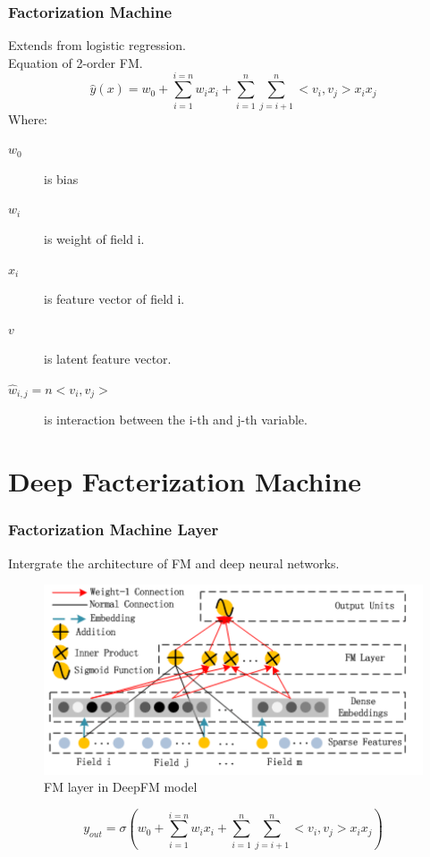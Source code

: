 \documentclass{beamer}
\begin{document}
\begin{frame}
	\frametitle{Factorization Machine}
	Extends from logistic regression. \\
	Equation of 2-order FM. \\
	\[
	\hat{y}(x) = w_{0} + \sum_{i=1}^{i=n} w_{i} x_{i} + \sum_{i=1}^n \sum_{j=i+1}^n<v_i, v_j>x_i x_j
	\]
	Where: 
	\begin{description}
		\item[$w_0$] is bias
		\item[$w_i$] is weight of field i.
		\item[$x_i$] is feature vector of field i. 
		\item[$v$] is latent feature vector.
		\item[$\hat{w}_{i,j} =n<v_i, v_j>$] is interaction between the i-th and j-th variable.
	\end{description}
\end{frame}
\section{Deep Facterization Machine}
\frame{\tableofcontents[currentsection]}
\begin{frame}	
	\frametitle{Factorization Machine Layer}	
	Intergrate the architecture of FM and deep neural networks.	
	\begin{figure}
		\includegraphics[scale=0.25]{FM_layers}
		\caption{FM layer in DeepFM model}
	\end{figure}
	\[
	y_{out} = \sigma(w_{0} + \sum_{i=1}^{i=n} w_{i} x_{i} + \sum_{i=1}^n \sum_{j=i+1}^n<v_i, v_j>x_i x_j)
	\]
\end{frame}
\end{document}
